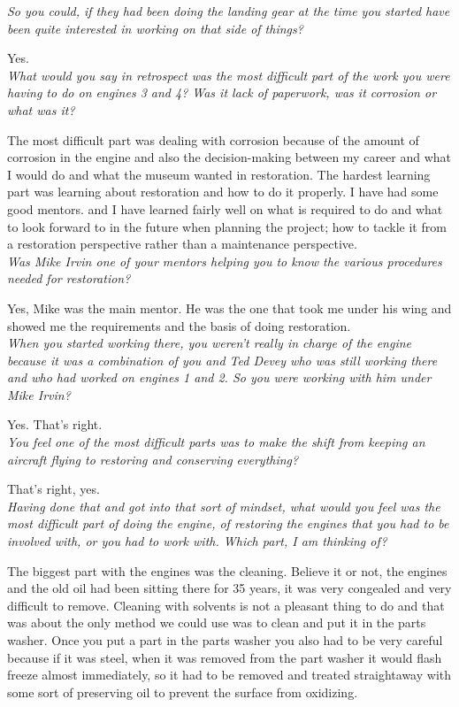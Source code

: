 \noindent\textit{So you could, if they had been doing the landing gear at the
time you started have been quite interested in working on that side of things?}

Yes.\\

\noindent\textit{What would you say in retrospect was the most difficult part of
the work you were having to do on engines 3 and 4?  Was it lack of paperwork,
was it corrosion or what was it?}

The most difficult part was dealing with corrosion because of the amount of
corrosion in the engine and also the decision-making between my career and what
I would do and what the museum wanted in restoration. The hardest learning part
was learning about restoration and how to do it properly. I have had some good
mentors.  and I have learned fairly well on what is required to do and what to
look forward to in the future when planning the project; how to tackle it from a
restoration perspective rather than a maintenance perspective.\\

\noindent\textit{Was Mike Irvin one of your mentors helping you to know the
various procedures needed for restoration?}

Yes, Mike was the main mentor.  He was the one that took me under his wing and
showed me the requirements and the basis of doing restoration.\\

\noindent\textit{When you started working there, you weren't really in charge of
the engine because it was a combination of you and Ted Devey who was still
working there and who had worked on engines 1 and 2.  So you were working with
him under Mike Irvin?}

Yes.  That's right.\\

\noindent\textit{You feel one of the most difficult parts was to make the shift
from keeping an aircraft flying to restoring and conserving everything?}

That's right, yes.\\

\noindent\textit{Having done that and got into that sort of mindset, what would
you feel was the most difficult part of doing the engine, of restoring the
engines that you had to be involved with, or you had to work with.  Which part,
I am thinking of?}

The biggest part with the engines was the cleaning.  Believe it or not, the
engines and the old oil had been sitting there for 35 years, it was very
congealed and very difficult to remove.  Cleaning with solvents is not a
pleasant thing to do and that was about the only method we could use was to
clean and put it in the parts washer.  Once you put a part in the parts washer
you also had to be very careful because if it was steel, when it was removed
from the part washer it would flash freeze almost immediately, so it had to be
removed and treated straightaway with some sort of preserving oil to prevent the
surface from oxidizing.\\

